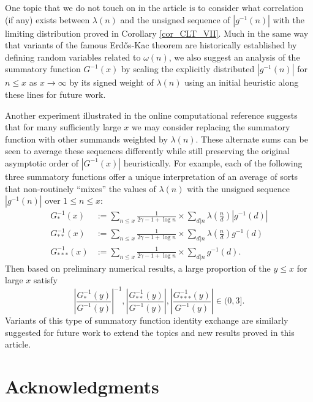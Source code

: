 \documentclass[11pt,reqno,a4letter]{article}
\numberwithin{figure}{section}
\numberwithin{table}{section}
\theoremstyle{plain}
\numberwithin{theorem}{section}
\theoremstyle{definition}
\begin{document}
One topic that we do not touch on in the article is to consider what 
correlation (if any) exists between $\lambda(n)$ and the unsigned sequence of $|g^{-1}(n)|$ 
with the limiting distribution proved in 
Corollary \ref{cor_CLT_VII}. 
Much in the same way that variants of the famous Erd\H{o}s-Kac theorem are historically established 
by defining random variables related to $\omega(n)$, 
we also suggest an analysis of the summatory function $G^{-1}(x)$ by scaling 
the explicitly distributed $|g^{-1}(n)|$ for $n \leq x$ as $x \rightarrow \infty$ by 
its signed weight of $\lambda(n)$ using an initial heuristic along these lines 
for future work. 

Another experiment illustrated in the online computational reference 
\cite{SCHMIDT-MERTENS-COMPUTATIONS} suggests that 
for many sufficiently large $x$ we may consider replacing the 
summatory function with other summands weighted by $\lambda(n)$. 
These alternate sums can be seen to average these sequences differently while still 
preserving the original asymptotic order of $|G^{-1}(x)|$ heuristically. 
For example, each of the following three summatory functions offer a unique 
interpretation of an average of sorts that non-routinely ``mixes'' the values of 
$\lambda(n)$ with the unsigned sequence $|g^{-1}(n)|$ over $1 \leq n \leq x$: 
\begin{align*}
G_{\ast}^{-1}(x) & := \sum_{n \leq x} \frac{1}{2\gamma-1+\log n} \times 
     \sum_{d|n} \lambda\left(\frac{n}{d}\right) |g^{-1}(d)| \\ 
G_{\ast\ast}^{-1}(x) & := \sum_{n \leq x} \frac{1}{2\gamma-1+\log n} \times 
     \sum_{d|n} \lambda\left(\frac{n}{d}\right) g^{-1}(d) \\ 
G_{\ast\ast\ast}^{-1}(x) & := \sum_{n \leq x} \frac{1}{2\gamma-1+\log n} \times 
     \sum_{d|n} g^{-1}(d). 
\end{align*}
Then based on preliminary numerical results, a large proportion of the $y \leq x$ for 
large $x$ satisfy 
\[
     \left\lvert \frac{G_{\ast}^{-1}(y)}{G^{-1}(y)} \right\rvert^{-1}, 
     \left\lvert \frac{G_{\ast\ast}^{-1}(y)}{G^{-1}(y)} \right\rvert, 
     \left\lvert \frac{G_{\ast\ast\ast}^{-1}(y)}{G^{-1}(y)} \right\rvert \in 
     (0, 3]. 
\]
Variants of this type of summatory function identity exchange are similarly 
suggested for future work to extend the topics and new results proved in this article.

\section*{Acknowledgments}
\end{document}
